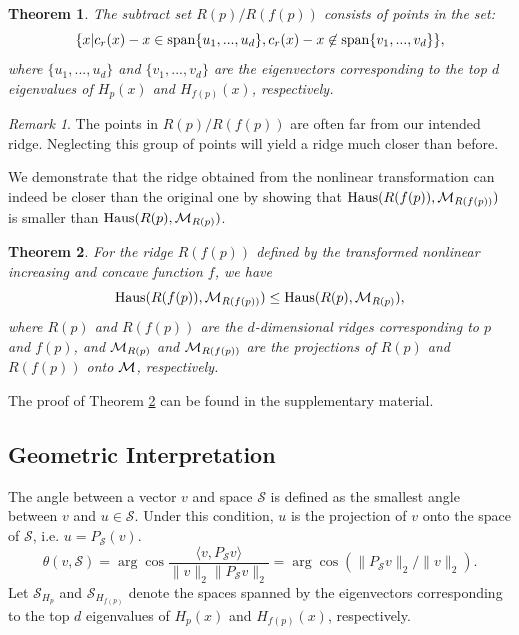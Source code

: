 \documentclass[aos,preprint]{imsart}
\newtheorem{theorem}{Theorem}[section]
\theoremstyle{remark}
\newtheorem*{remark}{Remark}
\begin{document}
\begin{theorem}{The subtract set $R(p)/R(f(p))$ consists of points in the set:
\[
\{ x | c_r(x) - x \in {\rm span} \{u_1,...,u_d\}, c_r(x) - x \not \in {\rm span} \{v_1,...,v_d\}\},
\] 
where $\{u_1,...,u_d\}$ and $\{v_1,...,v_d\}$ are the eigenvectors corresponding to the top $d$ eigenvalues of $H_p(x)$ and $H_{f(p)}(x)$}, respectively. 
\end{theorem}
\begin{remark}
The points in $R(p)/R(f(p))$ are often far from our intended ridge. Neglecting this group of points will yield a ridge much closer than before.
\end{remark}
We demonstrate that the ridge obtained from the nonlinear transformation can indeed be closer than the original one by showing that ${\rm Haus} (R(f(p)), {\cal M}_{R(f(p))})$ is smaller than ${\rm Haus} (R(p), {\cal M}_{R(p)})$.
\begin{theorem}\label{Transformed Inequality Theorem}
For the ridge $R(f(p))$ defined by the transformed nonlinear increasing and concave function $f$, we have
\[
{\rm Haus} (R(f(p)), {\cal M}_{R(f(p))}) \leq {\rm Haus} (R(p), {\cal M}_{R(p)}),
\]
where $R(p)$ and $R(f(p))$ are the $d$-dimensional ridges corresponding to $p$ and $f(p)$, and ${\cal M}_{R(p)}$ and ${\cal M}_{R(f(p))}$ are the projections of $R(p)$ and $R(f(p))$ onto $\cal M$, respectively.
\end{theorem}
The proof of Theorem \ref{Transformed Inequality Theorem} can be found in the supplementary material.%
\subsection{Geometric Interpretation}

The angle between a vector $v$ and space $\mathcal S$ is defined as the smallest angle between $v$ and $u \in \mathcal S$. Under this condition, $u$ is the projection of $v$ onto the space of $\mathcal S$, i.e. $u = { P_{\mathcal S}}(v)$.
\[
\theta(v, {\mathcal S}) = \arg \cos \frac{\langle v, {P}_{\mathcal S} v\rangle }{\|v\|_2 \|{P}_{\mathcal S} v\|_2} =   \arg \cos( \| P_{\mathcal S} v\|_2 / \|v\|_2 ).
\]
Let ${\mathcal S}_{H_p}$ and ${\mathcal S}_{H_{f(p)}}$ denote the spaces spanned by the eigenvectors corresponding to the top $d$ eigenvalues of $H_p(x)$ and $H_{f(p)}(x)$, respectively.
 
\end{document}
